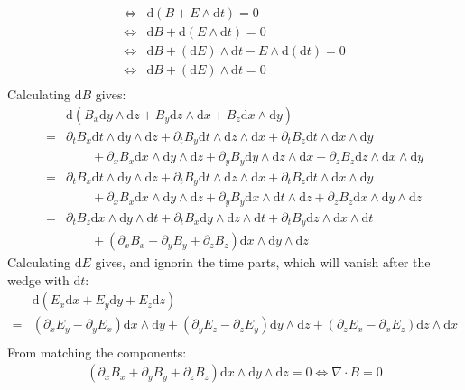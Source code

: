 \documentclass[12pt,a4]{article}
\newcommand{\e}{\mathrm{d}}
\begin{document}
\begin{enumerate}
\begin{enumerate}
\begin{align*}
          \Leftrightarrow &\e (B + E \wedge \e t) = 0\\
          \Leftrightarrow &\e B + \e (E \wedge \e t) = 0\\
          \Leftrightarrow &\e B + (\e E) \wedge \e t - E \wedge \e(\e t) = 0\\
          \Leftrightarrow &\e B + (\e E) \wedge \e t  = 0\\
        \end{align*}
        Calculating $\e B$ gives:
        \begin{align*}
            & \e(B_x \e y \wedge \e z + B_y \e z \wedge \e x + B_z \e x \wedge \e y) \\
          = & \partial_t B_x  \e t \wedge \e y \wedge \e z + \partial_t B_y  \e t \wedge \e z \wedge \e x + \partial_t B_z  \e t \wedge \e x \wedge \e y\\
            & \qquad + \partial_x B_x \e x \wedge \e y \wedge \e z + \partial_y B_y \e y \wedge \e z \wedge \e x  + \partial_z B_z \e z \wedge \e x \wedge \e y\\
          = & \partial_t B_x  \e t \wedge \e y \wedge \e z + \partial_t B_y  \e t \wedge \e z \wedge \e x + \partial_t B_z  \e t \wedge \e x \wedge \e y\\
            & \qquad + \partial_x B_x \e x \wedge \e y \wedge \e z + \partial_y B_y \e x \wedge \e t \wedge \e z + \partial_z B_z \e x \wedge \e y \wedge \e z\\
          = & \partial_t B_z  \e x \wedge \e y \wedge \e t + \partial_t B_x  \e y \wedge \e z \wedge \e t + \partial_t B_y  \e z \wedge \e x \wedge \e t \\
            & \qquad + (\partial_x B_x + \partial_y B_y + \partial_z B_z )\e x \wedge \e y \wedge \e z
        \end{align*}
        Calculating $\e E$ gives, and ignorin the time parts, which will vanish after the wedge with $\e t$:
        \begin{align*}
          &\e (E_x \e x + E_y \e y + E_z \e z) \\
          = &(\partial_x E_y - \partial_y E_x) \e x \wedge \e y + (\partial_y  E_z - \partial_z  E_y)\e y \wedge \e z + (\partial_z  E_x - \partial_x  E_z)\e z \wedge \e x\\
        \end{align*}
        From matching the components:
        \begin{align*}
            (\partial_x B_x + \partial_y B_y + \partial_z B_z )\e x \wedge \e y \wedge \e z = 0 \Leftrightarrow \nabla \cdot B = 0

\end{align*}
\end{enumerate}
\end{enumerate}
\end{document}
